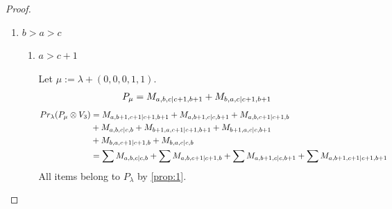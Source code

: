 \begin{proof}
\begin{enumerate}
\begin{enumerate}
\begin{table}[htbp]
\begin{tabular}{cc}
{ $M_{c+2,c+1,c+3|c+2,c+3}$
}\\
\bottomrule
\end{tabular}
\vspace{0.5em}
\parbox{\linewidth}{\small
\textbf{Interpretation:}
This table displays only selected computational results. This partial presentation does not affect our conclusion.
}
\end{table}
    \end{enumerate}
  \item $b>a>c$
    \begin{enumerate}
      \item $a>c+1$ \par
        Let $\mu:=\lambda + (0,0,0,1,1) $.
        \begin{equation}\notag
          \begin{aligned}
            P_\mu = M_{a,b,c|c+1,b+1}
+ M_{b,a,c|c+1,b+1}
          \end{aligned}
        \end{equation}
        \begin{equation}\notag
          \begin{aligned}
            Pr_{\lambda}(P_\mu \otimes V_{3}) &=
M_{a,b+1,c+1|c+1,b+1}
+ M_{a,b+1,c|c,b+1}
+ M_{a,b,c+1|c+1,b}\\
                                              &
+ M_{a,b,c|c,b}
+ M_{b+1,a,c+1|c+1,b+1}
+ M_{b+1,a,c|c,b+1}\\
                                              &
+ M_{b,a,c+1|c+1,b}
+ M_{b,a,c|c,b} \\
                                               &=
\sum M_{a,b,c|c,b}
+ \sum M_{a,b,c+1|c+1,b}
+ \sum M_{a,b+1,c|c,b+1}
+ \sum M_{a,b+1,c+1|c+1,b+1}
          \end{aligned}
        \end{equation}
All items belong to $P_\lambda$ by \cref{prop:1}.


\end{enumerate}
\end{enumerate}
\end{proof}
